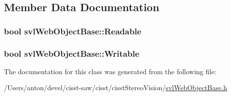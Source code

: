 \subsection{Member Data Documentation}
\hypertarget{classsvl_web_object_base_a6e60e80b45caae93a766426f7aa13124}{}
\subsubsection[{Readable}]{\setlength{\rightskip}{0pt plus 5cm}bool svl\+Web\+Object\+Base\+::\+Readable\hspace{0.3cm}{\ttfamily [protected]}}\label{classsvl_web_object_base_a6e60e80b45caae93a766426f7aa13124}
\hypertarget{classsvl_web_object_base_a515395da928c86641270ece2ab7c1188}{}
\subsubsection[{Writable}]{\setlength{\rightskip}{0pt plus 5cm}bool svl\+Web\+Object\+Base\+::\+Writable\hspace{0.3cm}{\ttfamily [protected]}}\label{classsvl_web_object_base_a515395da928c86641270ece2ab7c1188}


The documentation for this class was generated from the following file\+:\begin{DoxyCompactItemize}
\item 
/\+Users/anton/devel/cisst-\/saw/cisst/cisst\+Stereo\+Vision/\hyperlink{svl_web_object_base_8h}{svl\+Web\+Object\+Base.\+h}\end{DoxyCompactItemize}
